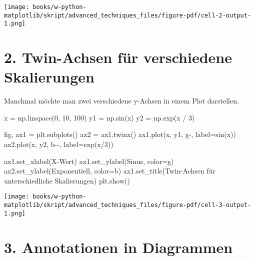 \documentclass[
  letterpaper,
  DIV=11,
  numbers=noendperiod]{scrreprt}
\newenvironment{Shaded}{\begin{snugshade}}{\end{snugshade}}
\newcommand{\DecValTok}[1]{\textcolor[rgb]{0.68,0.00,0.00}{#1}}
\newcommand{\NormalTok}[1]{\textcolor[rgb]{0.00,0.23,0.31}{#1}}
\newcommand{\OperatorTok}[1]{\textcolor[rgb]{0.37,0.37,0.37}{#1}}
\newcommand{\StringTok}[1]{\textcolor[rgb]{0.13,0.47,0.30}{#1}}
\begin{document}
\begin{tcolorbox}
\texttt{[image: books/w-python-matplotlib/skript/advanced\_techniques\_files/figure-pdf/cell-2-output-1.png]}

\section{2. Twin-Achsen für verschiedene
Skalierungen}\label{twin-achsen-fuxfcr-verschiedene-skalierungen}

Manchmal möchte man zwei verschiedene y-Achsen in einem Plot darstellen.

\begin{Shaded}
\begin{Highlighting}[]
\NormalTok{x }\OperatorTok{=}\NormalTok{ np.linspace(}\DecValTok{0}\NormalTok{, }\DecValTok{10}\NormalTok{, }\DecValTok{100}\NormalTok{)}
\NormalTok{y1 }\OperatorTok{=}\NormalTok{ np.sin(x)}
\NormalTok{y2 }\OperatorTok{=}\NormalTok{ np.exp(x }\OperatorTok{/} \DecValTok{3}\NormalTok{)}

\NormalTok{fig, ax1 }\OperatorTok{=}\NormalTok{ plt.subplots()}
\NormalTok{ax2 }\OperatorTok{=}\NormalTok{ ax1.twinx()}
\NormalTok{ax1.plot(x, y1, }\StringTok{\textquotesingle{}g{-}\textquotesingle{}}\NormalTok{, label}\OperatorTok{=}\StringTok{\textquotesingle{}sin(x)\textquotesingle{}}\NormalTok{)}
\NormalTok{ax2.plot(x, y2, }\StringTok{\textquotesingle{}b{-}{-}\textquotesingle{}}\NormalTok{, label}\OperatorTok{=}\StringTok{\textquotesingle{}exp(x/3)\textquotesingle{}}\NormalTok{)}

\NormalTok{ax1.set\_xlabel(}\StringTok{\textquotesingle{}X{-}Wert\textquotesingle{}}\NormalTok{)}
\NormalTok{ax1.set\_ylabel(}\StringTok{\textquotesingle{}Sinus\textquotesingle{}}\NormalTok{, color}\OperatorTok{=}\StringTok{\textquotesingle{}g\textquotesingle{}}\NormalTok{)}
\NormalTok{ax2.set\_ylabel(}\StringTok{\textquotesingle{}Exponentiell\textquotesingle{}}\NormalTok{, color}\OperatorTok{=}\StringTok{\textquotesingle{}b\textquotesingle{}}\NormalTok{)}
\NormalTok{ax1.set\_title(}\StringTok{\textquotesingle{}Twin{-}Achsen für unterschiedliche Skalierungen\textquotesingle{}}\NormalTok{)}
\NormalTok{plt.show()}
\end{Highlighting}
\end{Shaded}

\texttt{[image: books/w-python-matplotlib/skript/advanced\_techniques\_files/figure-pdf/cell-3-output-1.png]}

\section{3. Annotationen in
Diagrammen}\label{annotationen-in-diagrammen}


\end{tcolorbox}
\end{document}
